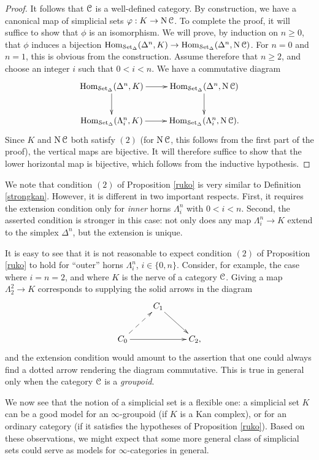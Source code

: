\begin{proof}
It follows that $\operatorname{\mathcal{C}}$ is a well-defined category. By construction, we have a canonical
map of simplicial sets $\varphi: K \rightarrow \operatorname{N} \operatorname{\mathcal{C}}$. To complete the proof, it will suffice
to show that $\phi$ is an isomorphism. We will prove, by induction on
$n \geq 0$, that $\phi$ induces a bijection $\operatorname{Hom}_{ \operatorname{\mathcal{S}et_{\Delta}}}( \Delta^n, K) \rightarrow
\operatorname{Hom}_{\operatorname{\mathcal{S}et_{\Delta}}}( \Delta^n, \operatorname{N} \operatorname{\mathcal{C}})$. For $n=0$ and $n=1$, this is obvious from
the construction. Assume therefore that $n \geq 2$, and choose an integer $i$ such
that $0 < i < n$. We have a commutative diagram
$$ \xymatrix{ \Hom_{\sSet}( \Delta^n, K ) \ar[r] \ar[d] & \Hom_{\sSet}( \Delta^n, \Nerve \calC) \ar[d] \\
\Hom_{ \sSet}( \Lambda^n_i, K) \ar[r] & \Hom_{\sSet}( \Lambda^n_i, \Nerve \calC ). }$$
Since $K$ and $\operatorname{N} \operatorname{\mathcal{C}}$ both satisfy $(2)$ (for $\operatorname{N} \operatorname{\mathcal{C}}$, this follows
from the first part of the proof), the vertical maps are bijective. It will therefore suffice to show that the lower horizontal map is bijective, which follows from the inductive hypothesis.
\end{proof}

We note that condition $(2)$ of Proposition \ref{ruko} is very similar to Definition \ref{strongkan}. However, it is different in two important respects. First, it requires the extension condition only for {\em inner} horns $\Lambda^n_i$ with $0 < i < n$. Second, the asserted condition is stronger in this case: not only does any map $\Lambda^n_i \rightarrow K$ extend to the simplex $\Delta^n$, but the extension is unique.

\begin{remark}\label{nottes}
It is easy to see that it is not reasonable to expect condition $(2)$ of Proposition \ref{ruko} to hold for ``outer'' horns $\Lambda^n_i$, $i \in \{0,n\}$. Consider, for example, the case where $i=n=2$, and where $K$ is the nerve of a category $\operatorname{\mathcal{C}}$. Giving a map $\Lambda^2_2 \rightarrow K$
corresponds to supplying the solid arrows in the diagram
$$ \xymatrix{ & C_1 \ar[dr] & \\
C_0 \ar[rr] \ar@{-->}[ur] & & C_2,} $$
and the extension condition would amount to the assertion that one could always find a dotted arrow rendering the diagram commutative. This is true in general only when the category $\operatorname{\mathcal{C}}$ is a {\em groupoid}.
\end{remark}

We now see that the notion of a simplicial set is a flexible one: a simplicial set $K$ can be a good model for an $\infty$-groupoid (if $K$ is a Kan complex), or for an ordinary category (if it satisfies the hypotheses of Proposition \ref{ruko}). Based on these observations, we might expect that some more general class of simplicial sets could serve as models for $\infty$-categories in general.


